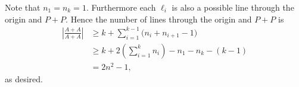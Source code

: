 Note that $n_1=n_k=1$. Furthermore each $\ell_i$ is also a possible line through the origin and $P+P$. Hence the number of lines through the origin and $P+P$ is
\begin{align*}
    \left\lvert\frac{A+A}{A+A}\right\rvert&\ge k+\sum_{i=1}^{k-1}\big(n_i+n_{i+1}-1\big)\\
    &\ge k+2\left(\sum_{i=1}^kn_i\right)-n_1-n_k-(k-1)\\
    &=2n^2-1,
\end{align*}
as desired.

